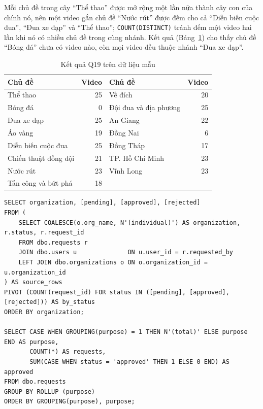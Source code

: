 Mỗi chủ đề trong cây ``Thể thao'' được mở rộng một lần nữa thành cây con của chính nó, nên
một video gắn chủ đề ``Nước rút'' được đếm cho cả ``Diễn biến cuộc đua'', ``Đua xe đạp'' và
``Thể thao''; \texttt{COUNT(DISTINCT)} tránh đếm một video hai lần khi nó có nhiều chủ đề
trong cùng nhánh. Kết quả (Bảng~\ref{tab:q19}) cho thấy chủ đề ``Bóng đá'' chưa có video nào,
còn mọi video đều thuộc nhánh ``Đua xe đạp''.

\begin{table}[H]
\centering
\caption{Kết quả Q19 trên dữ liệu mẫu}
\label{tab:q19}
\small
\begin{tabular}{lr@{\hspace{2.5em}}lr}
\toprule
\textbf{Chủ đề} & \textbf{Video} & \textbf{Chủ đề} & \textbf{Video} \\
\midrule
Thể thao & 25 & \quad\quad\quad Về đích & 20 \\
\quad Bóng đá & 0 & \quad\quad Đội đua và địa phương & 25 \\
\quad Đua xe đạp & 25 & \quad\quad\quad An Giang & 22 \\
\quad\quad Áo vàng & 19 & \quad\quad\quad Đồng Nai & 6 \\
\quad\quad Diễn biến cuộc đua & 25 & \quad\quad\quad Đồng Tháp & 17 \\
\quad\quad\quad Chiến thuật đồng đội & 21 & \quad\quad\quad TP. Hồ Chí Minh & 23 \\
\quad\quad\quad Nước rút & 23 & \quad\quad\quad Vĩnh Long & 23 \\
\quad\quad\quad Tấn công và bứt phá & 18 & & \\
\bottomrule
\end{tabular}
\end{table}

\begin{lstlisting}[caption={Q21 (PIVOT) và Q22 (ROLLUP)}, label={lst:q21}]
SELECT organization, [pending], [approved], [rejected]
FROM (
    SELECT COALESCE(o.org_name, N'(individual)') AS organization, r.status, r.request_id
    FROM dbo.requests r
    JOIN dbo.users u              ON u.user_id = r.requested_by
    LEFT JOIN dbo.organizations o ON o.organization_id = u.organization_id
) AS source_rows
PIVOT (COUNT(request_id) FOR status IN ([pending], [approved], [rejected])) AS by_status
ORDER BY organization;

SELECT CASE WHEN GROUPING(purpose) = 1 THEN N'(total)' ELSE purpose END AS purpose,
       COUNT(*) AS requests,
       SUM(CASE WHEN status = 'approved' THEN 1 ELSE 0 END) AS approved
FROM dbo.requests
GROUP BY ROLLUP (purpose)
ORDER BY GROUPING(purpose), purpose;
\end{lstlisting}

